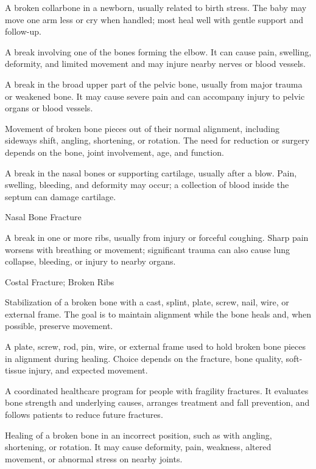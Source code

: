  A broken collarbone in a newborn, usually related to birth stress. The baby may move one arm less or cry when handled; most heal well with gentle support and follow-up.

 A break involving one of the bones forming the elbow. It can cause pain, swelling, deformity, and limited movement and may injure nearby nerves or blood vessels.

 A break in the broad upper part of the pelvic bone, usually from major trauma or weakened bone. It may cause severe pain and can accompany injury to pelvic organs or blood vessels.

 Movement of broken bone pieces out of their normal alignment, including sideways shift, angling, shortening, or rotation. The need for reduction or surgery depends on the bone, joint involvement, age, and function.

 A break in the nasal bones or supporting cartilage, usually after a blow. Pain, swelling, bleeding, and deformity may occur; a collection of blood inside the septum can damage cartilage.

\synonyms
Nasal Bone Fracture

 A break in one or more ribs, usually from injury or forceful coughing. Sharp pain worsens with breathing or movement; significant trauma can also cause lung collapse, bleeding, or injury to nearby organs.

\synonyms
Costal Fracture; Broken Ribs

 Stabilization of a broken bone with a cast, splint, plate, screw, nail, wire, or external frame. The goal is to maintain alignment while the bone heals and, when possible, preserve movement.

 A plate, screw, rod, pin, wire, or external frame used to hold broken bone pieces in alignment during healing. Choice depends on the fracture, bone quality, soft-tissue injury, and expected movement.

 A coordinated healthcare program for people with fragility fractures. It evaluates bone strength and underlying causes, arranges treatment and fall prevention, and follows patients to reduce future fractures.

 Healing of a broken bone in an incorrect position, such as with angling, shortening, or rotation. It may cause deformity, pain, weakness, altered movement, or abnormal stress on nearby joints.

